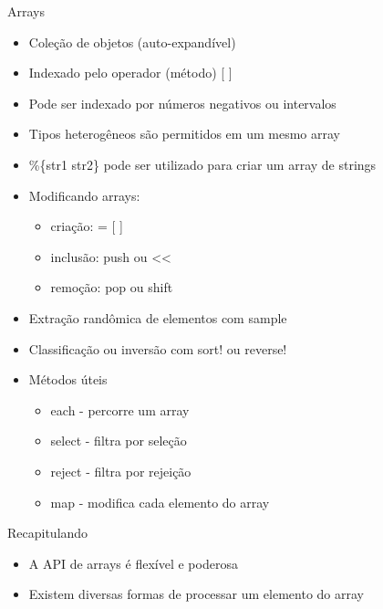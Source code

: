 
\begin{frame}{Arrays}
  \begin{itemize}
    \item Coleção de objetos (auto-expandível)
    \item Indexado pelo operador (método) \alert{[ ]}
    \item Pode ser indexado por números negativos ou intervalos
    \item Tipos heterogêneos são permitidos em um mesmo array
    \item \%\{str1 str2\} pode ser utilizado para criar um array de strings
  \end{itemize}
  
  
\pagebreak
  \begin{itemize}
    \item Modificando arrays:
    \begin{itemize}
      \item criação: \alert{= [ ]}
      \item inclusão: \alert{push} ou {<<}
      \item remoção: \alert{pop} ou {shift}
    \end{itemize}
    \item Extração randômica de elementos com \alert{sample}
    \item Classificação ou inversão com \alert{sort!} ou {reverse!}
  \end{itemize}  
  
  
  
\pagebreak
  \begin{itemize}
    \item Métodos úteis
    \begin{itemize}
      \item \alert{each} - percorre um array
      \item \alert{select} - filtra por seleção
      \item \alert{reject} - filtra por rejeição
      \item \alert{map} - modifica cada elemento do array
    \end{itemize}
  \end{itemize}  
  
  

\end{frame}

\begin{frame}[fragile,t]{Recapitulando}
  \begin{itemize}
    \item A API de arrays é flexível e poderosa
    \item Existem diversas formas de processar um elemento do array
  \end{itemize}
\end{frame}



